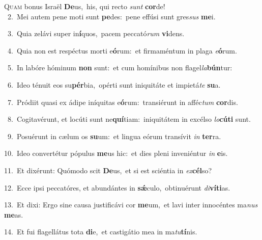 \lettrine{\initial\textcolor{\initialcolor}{Q}}{uam} bonus Israël \textbf{De}\-us,~\star his, qui recto \textit{sunt} \textbf{cor}\-de!\\
{\numbfont\textcolor{\numbcolor}{~2.}}~Mei autem pene moti sunt \textbf{pe}\-des:~\star pene effúsi sunt gres\textit{sus} \textbf{me}\-i.\par
{\numbfont\textcolor{\numbcolor}{~3.}}~Quia zelávi super in\-\textbf{í}\-quos,~\star pacem peccató\textit{rum} \textbf{vi}\-dens.\par
{\numbfont\textcolor{\numbcolor}{~4.}}~Quia non est respéctus morti e\-\textbf{ó}\-rum:~\star et firmaméntum in plaga \textit{e}\-\textbf{ó}rum.\par
{\numbfont\textcolor{\numbcolor}{~5.}}~In labóre hóminum \textbf{non} sunt:~\star et cum homínibus non flagel\-\textit{la}\-\textbf{bún}tur:\par
{\numbfont\textcolor{\numbcolor}{~6.}}~Ideo ténuit eos su\-\textbf{pér}\-bia,~\star opérti sunt iniquitáte et impietá\textit{te} \textbf{su}\-a.\par
{\numbfont\textcolor{\numbcolor}{~7.}}~Pródiit quasi ex ádipe iníquitas e\-\textbf{ó}\-rum:~\star transiérunt in afféc\textit{tum} \textbf{cor}\-dis.\par
{\numbfont\textcolor{\numbcolor}{~8.}}~Cogitavérunt, et locúti sunt ne\-\textbf{quí}\-tiam:~\star iniquitátem in excélso \textit{lo}\-\textbf{cú}\textbf{ti} sunt.\par
{\numbfont\textcolor{\numbcolor}{~9.}}~Posuérunt in cælum os \textbf{su}\-um:~\star et lingua eórum transívit \textit{in} \textbf{ter}\-ra.\par
{\numbfont\textcolor{\numbcolor}{10.}}~Ideo convertétur pópulus \textbf{me}\-us hic:~\star et dies pleni inveniéntur \textit{in} \textbf{e}\-is.\par
{\numbfont\textcolor{\numbcolor}{11.}}~Et dixérunt: Quómodo scit \textbf{De}\-us,~\star et si est sciéntia in \textit{ex}\-\textbf{cél}so?\par
{\numbfont\textcolor{\numbcolor}{12.}}~Ecce ipsi peccatóres, et abundántes in \textbf{sǽ}\-culo,~\star obtinuérunt \textit{di}\-\textbf{ví}\textbf{ti}as.\par
{\numbfont\textcolor{\numbcolor}{13.}}~Et dixi: Ergo sine causa justificávi cor \textbf{me}\-um,~\star et lavi inter innocéntes ma\textit{nus} \textbf{me}\-as.\par
{\numbfont\textcolor{\numbcolor}{14.}}~Et fui flagellátus tota \textbf{di}\-e,~\star et castigátio mea in ma\-\textit{tu}\-\textbf{tí}nis.\par
